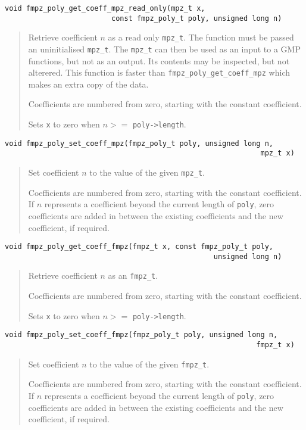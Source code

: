 \documentclass[a4paper,10pt]{article}
\newcommand{\code}{\lstinline}
\begin{document}
\begin{lstlisting}
void fmpz_poly_get_coeff_mpz_read_only(mpz_t x, 
                         const fmpz_poly_t poly, unsigned long n)
\end{lstlisting}
\begin{quote}
Retrieve coefficient $n$ as a read only \code{mpz_t}. The function must be passed an uninitialised \code{mpz_t}. The \code{mpz_t} can then be used as an input to a GMP functions, but not as an output. Its contents may be inspected, but not alterered. This function is faster than \code{fmpz_poly_get_coeff_mpz} which makes an extra copy of the data. 

Coefficients are numbered from zero, starting with the constant coefficient.

Sets \code{x} to zero when $n >= $ \code{poly->length}. 
\end{quote}

\begin{lstlisting}
void fmpz_poly_set_coeff_mpz(fmpz_poly_t poly, unsigned long n, 
                                                            mpz_t x) 
\end{lstlisting}
\begin{quote}
Set coefficient $n$ to the value of the given \code{mpz_t}. 

Coefficients are numbered from zero, starting with the constant coefficient. If $n$ represents a coefficient beyond the current length of \code{poly}, zero coefficients are added in between the existing coefficients and the new coefficient, if required.
\end{quote}

\begin{lstlisting}
void fmpz_poly_get_coeff_fmpz(fmpz_t x, const fmpz_poly_t poly, 
                                                 unsigned long n)
\end{lstlisting}
\begin{quote}
Retrieve coefficient $n$ as an \code{fmpz_t}. 

Coefficients are numbered from zero, starting with the constant coefficient.

Sets \code{x} to zero when $n >= $ \code{poly->length}. 
\end{quote}

\begin{lstlisting}
void fmpz_poly_set_coeff_fmpz(fmpz_poly_t poly, unsigned long n, 
                                                           fmpz_t x) 
\end{lstlisting}
\begin{quote}
Set coefficient $n$ to the value of the given \code{fmpz_t}. 

Coefficients are numbered from zero, starting with the constant coefficient. If $n$ represents a coefficient beyond the current length of \code{poly}, zero coefficients are added in between the existing coefficients and the new coefficient, if required.
\end{quote}
\end{document}
